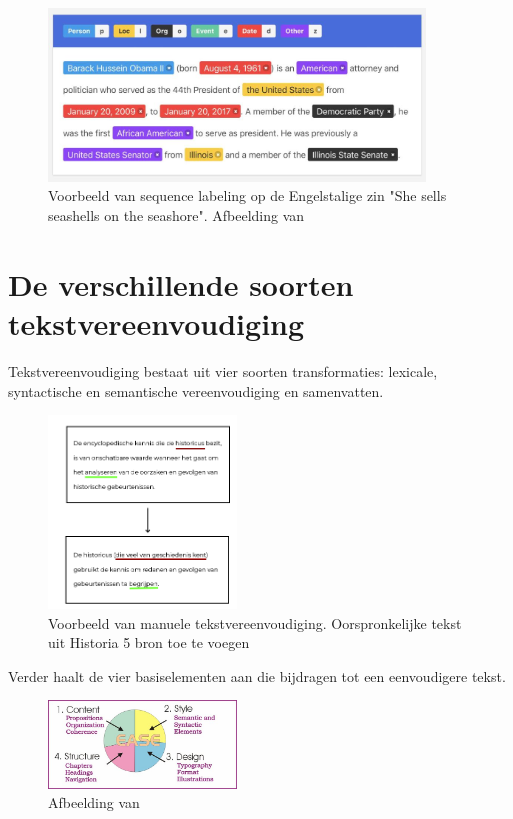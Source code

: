 \begin{figure}
	\begin{center}
		\includegraphics[width=10cm]{img/nerlabeling.jpg}
	\end{center}
	\caption{Voorbeeld van sequence labeling op de Engelstalige zin "She sells seashells on the seashore". Afbeelding van \textcite{Bilisci2021} }
	\label{fig:ner}
\end{figure}

\section{De verschillende soorten tekstvereenvoudiging}

Tekstvereenvoudiging bestaat uit vier soorten transformaties: lexicale, syntactische en semantische vereenvoudiging en samenvatten.

\begin{figure}
	\begin{center}
			\includegraphics[width=5cm]{img/voorbeeld-manuele-vereenvoudiging.png}
	\end{center}
	\caption{Voorbeeld van manuele tekstvereenvoudiging. Oorspronkelijke tekst uit Historia 5 bron toe te voegen}
\end{figure}

Verder haalt \textcite{Dubay2004} de vier basiselementen aan die bijdragen tot een eenvoudigere tekst.

\begin{figure}
	\begin{center}
		\includegraphics[width=5cm]{img/text-simplification-reading-ease.png}
	\end{center}
	\caption{Afbeelding van \textcite{Dubay2004}}
\end{figure}

